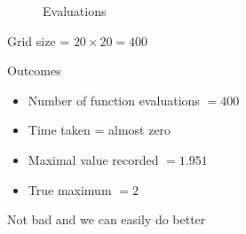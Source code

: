\begin{frame}
    
    \begin{figure}
       \begin{center}
           \caption{Evaluations}
       \end{center}
    \end{figure}

\end{frame}


\begin{frame}
    
    Grid size = $20 \times 20 = 400$

    Outcomes

    \begin{itemize}
        \item Number of function evaluations $= 400$
        \item Time taken = almost zero 
        \item Maximal value recorded $= 1.951$
        \item True maximum $= 2$
    \end{itemize}

    Not bad and we can easily do better

\end{frame}


